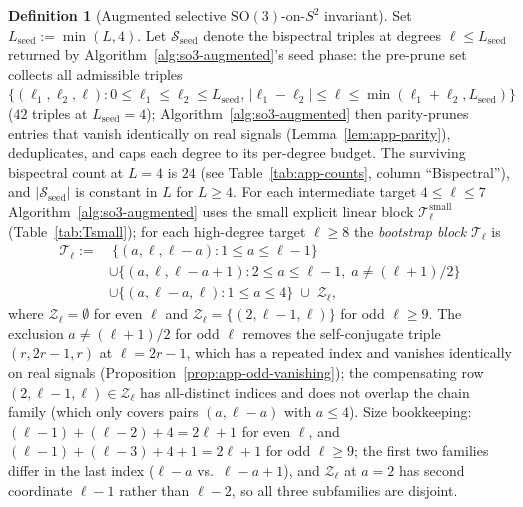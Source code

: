 \documentclass{article}
\theoremstyle{definition}
\newtheorem{definition}[theorem]{Definition}
\theoremstyle{remark}
\newcommand{\SO}{\mathrm{SO}}
\theoremstyle{definition}
\begin{document}
\begin{definition}[Augmented selective $\SO(3)$-on-$S^2$ invariant]\label{def:app-selective}
Set $L_{\mathrm{seed}} := \min(L,4)$. Let
$\mathcal{S}_{\mathrm{seed}}$ denote the bispectral triples at
degrees $\ell\le L_{\mathrm{seed}}$ returned by
Algorithm~\ref{alg:so3-augmented}'s seed phase: the pre-prune set
collects all admissible triples
$\{(\ell_1,\ell_2,\ell):
0\le\ell_1\le\ell_2\le L_{\mathrm{seed}},\,
|\ell_1{-}\ell_2|\le\ell\le\min(\ell_1{+}\ell_2,L_{\mathrm{seed}})\}$
($42$ triples at $L_{\mathrm{seed}}=4$); Algorithm~\ref{alg:so3-augmented}
then parity-prunes entries that vanish identically on real signals
(Lemma~\ref{lem:app-parity}), deduplicates, and caps each degree
to its per-degree budget. The surviving bispectral count at $L=4$
is $24$ (see Table~\ref{tab:app-counts}, column ``Bispectral''),
and $|\mathcal{S}_{\mathrm{seed}}|$ is constant in $L$ for $L\ge 4$.
For each intermediate target $4\le\ell\le 7$ Algorithm~\ref{alg:so3-augmented}
uses the small explicit linear block $\mathcal{T}_\ell^{\mathrm{small}}$
(Table~\ref{tab:Tsmall}); for each high-degree target $\ell\ge 8$
the \emph{bootstrap block} $\mathcal{T}_\ell$ is
\begin{equation}\label{eq:app-Tell}
\begin{aligned}
  \mathcal{T}_\ell
  := &\ \{(a,\ell,\ell-a) : 1\le a \le \ell{-}1\} \\
   &\cup \bigl\{(a,\ell,\ell-a+1) : 2\le a \le \ell{-}1,
        \; a \ne (\ell+1)/2 \bigr\} \\
   &\cup \{(a,\ell-a,\ell) : 1\le a \le 4\} \;\cup\; \mathcal{Z}_\ell,
\end{aligned}
\end{equation}
where $\mathcal{Z}_\ell = \emptyset$ for even $\ell$ and
$\mathcal{Z}_\ell = \{(2,\ell{-}1,\ell)\}$ for odd $\ell\ge 9$. The
exclusion $a\ne (\ell+1)/2$ for odd $\ell$ removes the self-conjugate
triple $(r,2r-1,r)$ at $\ell = 2r-1$, which has a repeated index and
vanishes identically on real signals
(Proposition~\ref{prop:app-odd-vanishing}); the compensating row
$(2,\ell{-}1,\ell)\in\mathcal{Z}_\ell$ has all-distinct indices and
does not overlap the chain family (which only covers pairs
$(a,\ell{-}a)$ with $a\le 4$). Size bookkeeping:
$(\ell{-}1)+(\ell{-}2)+4 = 2\ell{+}1$ for even $\ell$, and
$(\ell{-}1)+(\ell{-}3)+4+1 = 2\ell{+}1$ for odd $\ell\ge 9$; the first
two families differ in the last index ($\ell{-}a$ vs.\ $\ell{-}a+1$),
and $\mathcal{Z}_\ell$ at $a=2$ has second coordinate $\ell{-}1$
rather than $\ell{-}2$, so all three subfamilies are disjoint.


\end{definition}
\end{document}
